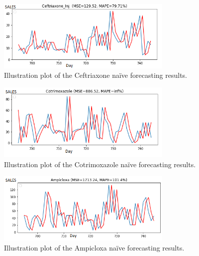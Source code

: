 \documentclass[12pt]{report}
\begin{document}
\begin{figure}[H]%
  \begin {center}
  \includegraphics[width=0.75\textwidth]{images/download (13)B.png}
  \caption{Illustration plot of the Ceftriaxone naïve forecasting results.}
  \label{fig:ecg}
  \end {center}
\end{figure}

\begin{figure}[H]%
  \begin {center}
  \includegraphics[width=0.75\textwidth]{images/download (13)C.png}
  \caption{Illustration plot of the Cotrimoxazole naïve forecasting results.}
  \label{fig:ecg}
  \end {center}
\end{figure}

\begin{figure}[H]%
  \begin {center}
  \includegraphics[width=0.75\textwidth]{images/download (14)A.png}
  \caption{Illustration plot of the Ampicloxa naïve forecasting results.}
  \label{fig:ecg}
  \end {center}
\end{figure}
\end{document}
